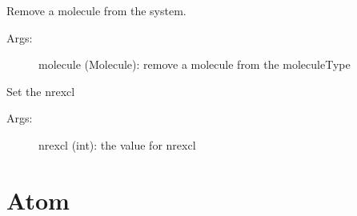 \documentclass[letterpaper,10pt,english]{sphinxmanual}
\begin{document}
\begin{fulllineitems}
\begin{fulllineitems}
\end{fulllineitems}



\begin{fulllineitems}
\label{moleculeType:ctools.MoleculeType.MoleculeType.removeMolecule}
Remove a molecule from the system.
\begin{description}
\item[{Args:}] \leavevmode
molecule (Molecule): remove a molecule from the moleculeType

\end{description}

\end{fulllineitems}



\begin{fulllineitems}
\label{moleculeType:ctools.MoleculeType.MoleculeType.setNrexcl}
Set the nrexcl
\begin{description}
\item[{Args:}] \leavevmode
nrexcl (int): the value for nrexcl

\end{description}

\end{fulllineitems}


\end{fulllineitems}



\chapter{Atom}
\label{atom:module-ctools.Atom}\label{atom::doc}\label{atom:atom}
\end{document}
